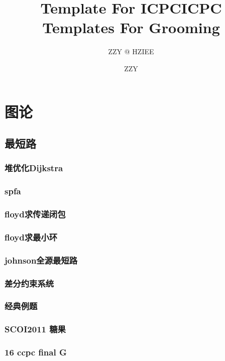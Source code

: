 \documentclass[10pt,a4paper]{article}
\title{Template For ICPC}
\author{ZZY @ HZIEE}
\begin{document}
\title{ICPC Templates For Grooming}
\author {ZZY}
\maketitle
\tableofcontents
\newpage
\section{图论}
\subsection{最短路}
\subsubsection{堆优化Dijkstra}

\subsubsection{spfa}

\subsubsection{floyd求传递闭包}

\subsubsection{floyd求最小环}

\subsubsection{johnson全源最短路}

\subsubsection{差分约束系统}

\subsubsection{经典例题}

\subsubsection{SCOI2011 糖果}

\subsubsection{16 ccpc final G}

\end{document}
